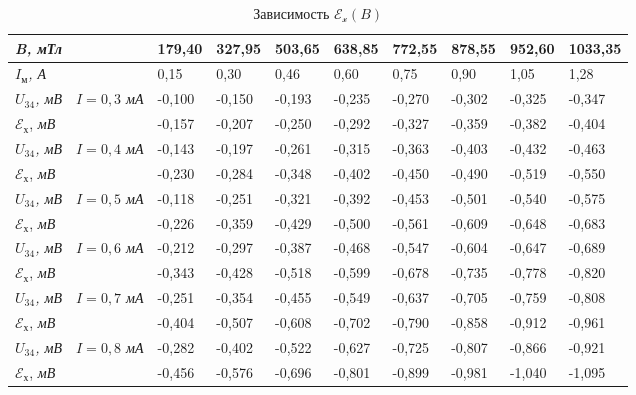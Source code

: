 \documentclass[a4paper, 12pt]{article}
\begin{document}
\begin{table}[h]
\caption{Зависимость $\mathscr{E_\text{x}}(B)$}
\small
\begin{tabular}{|l|l|l|l|l|l|l|l|l|l|}
\hline
\textit{B, мТл}  &  & 179,40 & 327,95 & 503,65 & 638,85 & 772,55 & 878,55 & 952,60 & 1033,35 \\ \hline
\textit{$I_{м}$, А}   & \textbf{}          & 0,15   & 0,30   & 0,46   & 0,60   & 0,75   & 0,90   & 1,05   & 1,28    \\ \hline
\textit{$U_{34}$, мВ} & \textit{$I=0,3$ мА}  & -0,100 & -0,150 & -0,193 & -0,235 & -0,270 & -0,302 & -0,325 & -0,347  \\ \cline{1-1} \cline{3-10} 
$\mathscr{E_\text{х}}$, \textit{мВ}   &  & -0,157 & -0,207 & -0,250 & -0,292 & -0,327 & -0,359 & -0,382 & -0,404  \\ \hline
\textit{$U_{34}$, мВ} & \textit{$I=0,4$ мА}  & -0,143 & -0,197 & -0,261 & -0,315 & -0,363 & -0,403 & -0,432 & -0,463  \\ \cline{1-1} \cline{3-10} 
$\mathscr{E_\text{х}}$, \textit{мВ}   &  & -0,230 & -0,284 & -0,348 & -0,402 & -0,450 & -0,490 & -0,519 & -0,550  \\ \hline
\textit{$U_{34}$, мВ} & \textit{$I=0,5$ мА}  & -0,118 & -0,251 & -0,321 & -0,392 & -0,453 & -0,501 & -0,540 & -0,575  \\ \cline{1-1} \cline{3-10} 
$\mathscr{E_\text{х}}$, \textit{мВ}   &          & -0,226 & -0,359 & -0,429 & -0,500 & -0,561 & -0,609 & -0,648 & -0,683  \\ \hline
\textit{$U_{34}$, мВ} & \textit{$I=0,6$ мА}  & -0,212 & -0,297 & -0,387 & -0,468 & -0,547 & -0,604 & -0,647 & -0,689  \\ \cline{1-1} \cline{3-10} 
$\mathscr{E_\text{х}}$, \textit{мВ}   &  & -0,343 & -0,428 & -0,518 & -0,599 & -0,678 & -0,735 & -0,778 & -0,820  \\ \hline
\textit{$U_{34}$, мВ} & \textit{$I=0,7$ мА}  & -0,251 & -0,354 & -0,455 & -0,549 & -0,637 & -0,705 & -0,759 & -0,808  \\ \cline{1-1} \cline{3-10} 
$\mathscr{E_\text{х}}$, \textit{мВ}   &                    & -0,404 & -0,507 & -0,608 & -0,702 & -0,790 & -0,858 & -0,912 & -0,961  \\ \hline
\textit{$U_{34}$, мВ} & \textit{$I=0,8$ мА}  & -0,282 & -0,402 & -0,522 & -0,627 & -0,725 & -0,807 & -0,866 & -0,921  \\ \cline{1-1} \cline{3-10} 
$\mathscr{E_\text{х}}$, \textit{мВ}   &                    & -0,456 & -0,576 & -0,696 & -0,801 & -0,899 & -0,981 & -1,040 & -1,095  \\ \hline

\end{tabular}
\end{table}
\end{document}
